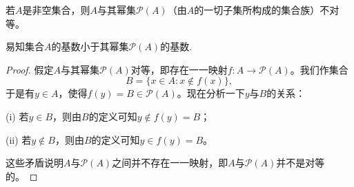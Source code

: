 \documentclass[../../main.tex]{subfiles}
\begin{document}
\begin{theorem}[无最大基数定理]\label{theorem:无最大基数定理}
若\(A\)是非空集合，则\(A\)与其幂集\(\mathcal{P}(A)\)（由\(A\)的一切子集所构成的集合族）不对等。
\end{theorem}
\begin{note}
  易知集合\(A\)的基数小于其幂集\(\mathcal{P}(A)\)的基数.
\end{note}
\begin{proof}
  假定\(A\)与其幂集\(\mathcal{P}(A)\)对等，即存在一一映射\(f:A\rightarrow\mathcal{P}(A)\)。我们作集合
\[B = \{x\in A:x\notin f(x)\},\]
于是有\(y\in A\)，使得\(f(y)=B\in\mathcal{P}(A)\)。现在分析一下\(y\)与\(B\)的关系：

(i) 若\(y\in B\)，则由\(B\)的定义可知\(y\notin f(y)=B\)；

(ii) 若\(y\notin B\)，则由\(B\)的定义可知\(y\in f(y)=B\)。

这些矛盾说明\(A\)与\(\mathcal{P}(A)\)之间并不存在一一映射，即\(A\)与\(\mathcal{P}(A)\)并不是对等的。

\end{proof}
\end{document}
